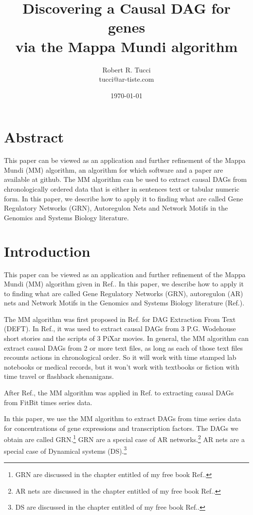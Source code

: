 \documentclass[12pt]{article}
\begin{document}
\title{Discovering a Causal DAG for genes \\ via the Mappa Mundi algorithm}
\date{ \today}
\author{Robert R. Tucci\\
        tucci@ar-tiste.com}
\maketitle
\vskip2cm
\section*{Abstract}
This paper can be viewed
as an application and further refinement 
of the Mappa Mundi (MM) algorithm,
an algorithm  for which software and a paper are available at github. 
The MM algorithm can be used to extract
causal DAGs from chronologically ordered data that is either in sentences text or tabular numeric form. 
In this paper, we 
describe how to apply it to finding what
are called Gene Regulatory Networks (GRN),
Autoregulon  Nets
and Network Motifs 
in the Genomics and Systems Biology literature.
\section{Introduction}

This paper can be viewed
as an application and further refinement 
of the Mappa Mundi (MM) algorithm given in Ref.\cite{mappa-mundi}.  
In this paper, we 
describe how to apply it to finding what
are called Gene Regulatory Networks (GRN),
autoregulon (AR) nets
and Network Motifs 
in the Genomics and Systems Biology literature (Ref.\cite{alon-book}).


The MM algorithm
was first proposed in Ref.\cite{mappa-mundi} 
for DAG Extraction From Text (DEFT). 
In Ref.\cite{mappa-mundi}, it was used to 
extract causal DAGs from 3 P.G. Wodehouse short stories and the scripts of 3 PiXar movies.
In general, the MM algorithm can extract causal DAGs from 2 or more 
text files, as long as each of
those text files recounts actions 
in chronological order. So it will work with time stamped lab
notebooks or medical records, 
but it won't work with textbooks or fiction with  time travel or flashback shenanigans.

After Ref.\cite{mappa-mundi}, the MM algorithm was applied in Ref.\cite{causal-fitbit} to extracting causal DAGs from FitBit times
series data.

In this paper, we use the MM algorithm
to extract DAGs from time series data for
concentrations of
gene expressions and transcription factors.
The DAGs we obtain are called GRN.\footnote{GRN are discussed in the chapter entitled  of my free book Ref.\cite{Bayesuvius}.} GRN are a
special case of AR networks.\footnote{AR nets are 
discussed in the chapter entitled  of 
my free book Ref.\cite{Bayesuvius}.}
AR nets are a special case of Dynamical systems (DS).\footnote{DS are discussed in the
chapter entitled 
of my free book Ref.\cite{Bayesuvius}.}
\end{document}
